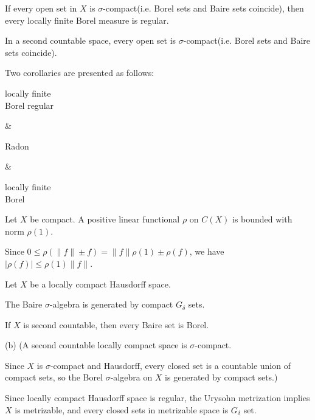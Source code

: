 \documentclass{../note}
\begin{document}
\begin{thm}
If every open set in $X$ is $\sigma$-compact(i.e. Borel sets and Baire sets coincide), then every locally finite Borel measure is regular.
\end{thm}
\begin{prop}
In a second countable space, every open set is $\sigma$-compact(i.e. Borel sets and Baire sets coincide).
\end{prop}


Two corollaries are presented as follows:
\begin{rd}[column sep={120pt,between origins}]
\parbox{7em}{\centering locally finite \\ Borel regular} \rar &
\parbox{5em}{\centering Radon} \rar {} &
\parbox{7em}{\centering locally finite \\ Borel} 
\end{rd}




\begin{prb}
Let $X$ be compact.
A positive linear functional $\rho$ on $C(X)$ is bounded with norm $\rho(1)$.
\end{prb}
\begin{pf}
Since $0\le\rho(\|f\|\pm f)=\|f\|\rho(1)\pm\rho(f)$, we have $|\rho(f)|\le\rho(1)\|f\|$.
\end{pf}

\begin{prb}
Let $X$ be a locally compact Hausdorff space.
\begin{parts}
\item The Baire $\sigma$-algebra is generated by compact $G_\delta$ sets.
\item If $X$ is second countable, then every Baire set is Borel.
\end{parts}
\end{prb}
\begin{sol}
(b)
(A second countable locally compact space is $\sigma$-compact.

Since $X$ is $\sigma$-compact and Hausdorff, every closed set is a countable union of compact sets, so the Borel $\sigma$-algebra on $X$ is generated by compact sets.)

Since locally compact Hausdorff space is regular, the Urysohn metrization implies $X$ is metrizable, and every closed sets in metrizable space is $G_\delta$ set.
\end{sol}
\end{document}
